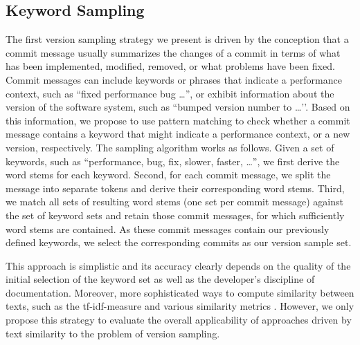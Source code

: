 \subsection{Keyword Sampling}
The first version sampling strategy we present is driven by the conception that
a commit message usually summarizes the changes of a commit in terms of what
has been implemented, modified, removed, or what problems have been fixed.
Commit messages can include keywords or phrases that indicate a performance
context, such as ``\textsf{fixed performance bug \ldots}'', or exhibit
information about the version of the software system, such as ``\textsf{bumped
version number to \ldots'}'.
Based on this information, we propose to use pattern matching to check whether a commit
message contains a keyword that might indicate a performance context, or a new
version, respectively. The sampling algorithm works as follows. Given a set of
keywords, such as ``\textsf{performance, bug, fix, slower, faster, \ldots}'', we
first derive the word stems for each keyword. Second, for each commit message, we split the
message into separate tokens and derive their corresponding word stems. Third,
we match all sets of resulting word stems (one set per commit message) against
the set of keyword sets and retain those commit messages, for which
sufficiently word stems are contained. As these commit messages contain our
previously defined keywords, we select the corresponding commits as our version
sample set.

This approach is simplistic and its accuracy clearly
depends on the quality of the initial selection of the keyword set as well as
the developer's discipline of documentation. Moreover, more sophisticated ways to compute similarity between texts, such as the tf-idf-measure and various
similarity metrics \citep{huang_similarity_2008}. However, we only propose this
strategy to evaluate the overall applicability of approaches driven by text
similarity to the problem of version sampling.

